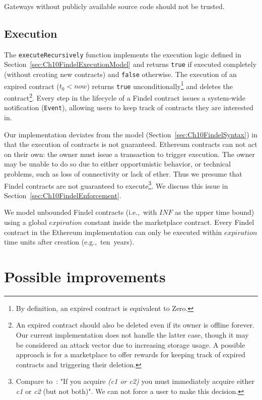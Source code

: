 Gateways without publicly available source code should not be trusted.


\subsection{Execution} \label{sec:Ch10FindelExecutionImplementation}

The \texttt{executeRecursively} function implements the execution logic defined in Section~\ref{sec:Ch10FindelExecutionModel} and returns \texttt{true} if executed completely (without creating new contracts) and \texttt{false} otherwise.
The execution of an expired contract ($t_0 < now$) returns \texttt{true} unconditionally\footnote{By definition, an expired contract is equivalent to \(\mathrm{Zero}\).} and deletes the contract\footnote{An expired contract should also be deleted even if its owner is offline forever. Our current implementation does not handle the latter case, though it may be considered an attack vector due to increasing storage usage. A possible approach is for a marketplace to offer rewards for keeping track of expired contracts and triggering their deletion.}.
Every step in the lifecycle of a Findel contract issues a system-wide notification (\texttt{Event}), allowing users to keep track of contracts they are interested in.

Our implementation deviates from the model (Section~\ref{sec:Ch10FindelSyntax}) in that the execution of contracts is not guaranteed.
Ethereum contracts can not act on their own: the owner must issue a transaction to trigger execution.
The owner may be unable to do so due to either opportunistic behavior, or technical problems, such as loss of connectivity or lack of ether.
Thus we presume that Findel contracts are not guaranteed to execute\footnote{Compare to~\cite{PeytonJones2000}: "If you acquire \textit{(c1 or c2)} you must immediately acquire either \textit{c1} or \textit{c2} (but not both)". We can not force a user to make this decision.}.
We discuss this issue in Section~\ref{sec:Ch10FindelEnforcement}.

We model unbounded Findel contracts (i.e.,~with $INF$ as the upper time bound) using a global $expiration$ constant inside the marketplace contract.
Every Findel contract in the Ethereum implementation can only be executed within $expiration$ time units after creation (e.g.,~ten~years).


\section{Possible improvements}

